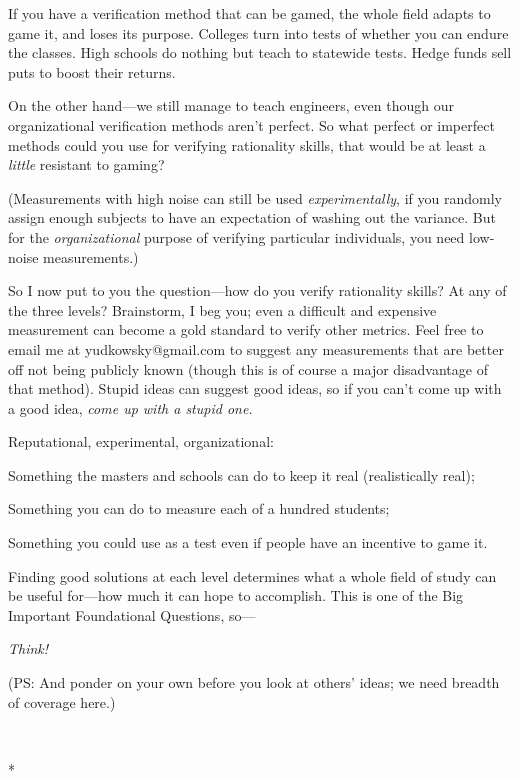 {
 If you have a verification method that can be gamed, the whole
field adapts to game it, and loses its purpose. Colleges turn into
tests of whether you can endure the classes. High schools do nothing
but teach to statewide tests. Hedge funds sell puts to boost their
returns.}

{
 On the other hand---we still manage to teach engineers, even
though our organizational verification methods aren't
perfect. So what perfect or imperfect methods could you use for
verifying rationality skills, that would be at least a \textit{little}
resistant to gaming?}

{
 (Measurements with high noise can still be used
\textit{experimentally}, if you randomly assign enough subjects to have
an expectation of washing out the variance. But for the
\textit{organizational} purpose of verifying particular individuals,
you need low-noise measurements.)}

{
 So I now put to you the question---how do you verify rationality
skills? At any of the three levels? Brainstorm, I beg you; even a
difficult and expensive measurement can become a gold standard to
verify other metrics. Feel free to email me at yudkowsky@gmail.com to
suggest any measurements that are better off not being publicly known
(though this is of course a major disadvantage of that method). Stupid
ideas can suggest good ideas, so if you can't come up
with a good idea, \textit{come up with a stupid one.}}

{
 Reputational, experimental, organizational:}

{
 Something the masters and schools can do to keep it real
(realistically real);}

{
 Something you can do to measure each of a hundred students;}

{
 Something you could use as a test even if people have an incentive
to game it.}

{
 Finding good solutions at each level determines what a whole field
of study can be useful for---how much it can hope to accomplish. This
is one of the Big Important Foundational Questions, so---}

{
 \textit{Think!}}

{
 (PS: And ponder on your own before you look at
others' ideas; we need breadth of coverage here.)}

{\centering
 \ ~
\par}

{\centering
 *
\par}

